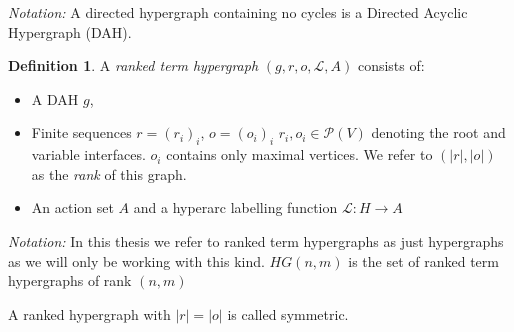 \documentclass[12pt]{article}
\theoremstyle{definition}
\newtheorem{definition}{Definition}[section]
\renewcommand{\P}{\mathcal{P}}
\newcommand{\1}{\mathbbm{1}}
\renewcommand{\L}{\mathcal{L}}
\begin{document}
\emph{Notation:} A directed hypergraph containing no cycles is a Directed Acyclic Hypergraph (DAH).

\begin{definition}
A \emph{ranked term hypergraph} $(g, r, o, \L, A)$ consists of:
\begin{itemize}
\item A DAH $g$,
\item Finite sequences $r = (r_i)_i$, $o = (o_i)_i$ $r_i, o_i\in \P(V)$ denoting the root and variable interfaces. $o_i$ contains only maximal vertices. We refer to $(|r|, |o|)$ as the \emph{rank} of this graph.
\item An action set $A$ and a hyperarc labelling function $\L: H\to A$
\end{itemize}
\end{definition}
\emph{Notation:} In this thesis we refer to ranked term hypergraphs as just hypergraphs as we will only be working with this kind. $HG(n,m)$ is the set of ranked term  hypergraphs of rank $(n,m)$

A ranked hypergraph with $|r| = |o|$ is called symmetric.
\end{document}
